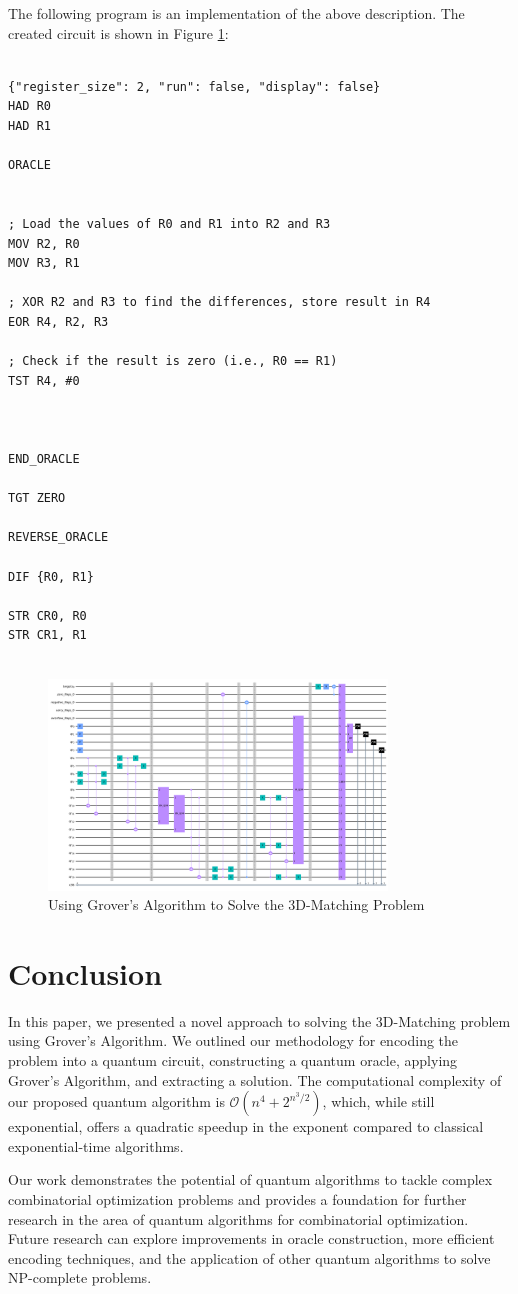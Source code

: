 The following program is an implementation of the above description. The created circuit is shown in Figure \ref{fig:3D-Matching}:

\begin{lstlisting}

{"register_size": 2, "run": false, "display": false}
HAD R0
HAD R1

ORACLE


; Load the values of R0 and R1 into R2 and R3
MOV R2, R0
MOV R3, R1

; XOR R2 and R3 to find the differences, store result in R4
EOR R4, R2, R3

; Check if the result is zero (i.e., R0 == R1)
TST R4, #0



END_ORACLE

TGT ZERO

REVERSE_ORACLE

DIF {R0, R1}

STR CR0, R0
STR CR1, R1


\end{lstlisting}

\begin{figure}[htp]
    \centering
    \includegraphics[width=9cm]{Figures/3D-Matching_circuit.png}
    \caption{Using Grover's Algorithm to Solve the 3D-Matching Problem}
    \label{fig:3D-Matching}
\end{figure}

\section{Conclusion} \label{sec:conclusion}

In this paper, we presented a novel approach to solving the 3D-Matching problem using Grover's Algorithm. We outlined our methodology for encoding the problem into a quantum circuit, constructing a quantum oracle, applying Grover's Algorithm, and extracting a solution. The computational complexity of our proposed quantum algorithm is $\mathcal{O}(n^4 + 2^{n^3/2})$, which, while still exponential, offers a quadratic speedup in the exponent compared to classical exponential-time algorithms.

Our work demonstrates the potential of quantum algorithms to tackle complex combinatorial optimization problems and provides a foundation for further research in the area of quantum algorithms for combinatorial optimization. Future research can explore improvements in oracle construction, more efficient encoding techniques, and the application of other quantum algorithms to solve NP-complete problems.

